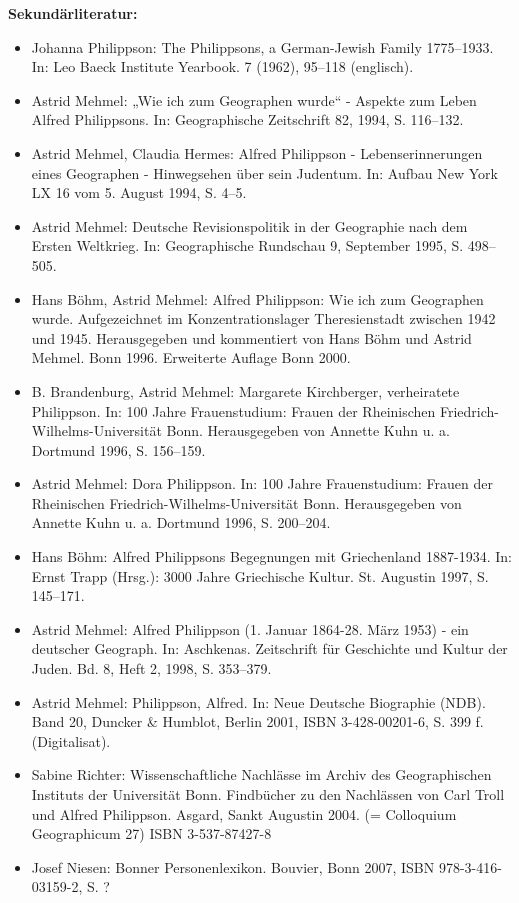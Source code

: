 \documentclass[a4paper]{article}
\begin{document}
\bigskip

\textbf{Sekundärliteratur:}

\begin{itemize}
\item Johanna Philippson: The Philippsons, a German-Jewish Family 1775–1933. In: Leo Baeck Institute Yearbook. 7 (1962),
95–118 (englisch).  
\item Astrid Mehmel: „Wie ich zum Geographen wurde“ - Aspekte zum Leben Alfred Philippsons. In: Geographische
Zeitschrift 82, 1994, S. 116–132.  
\item Astrid Mehmel, Claudia Hermes: Alfred Philippson - Lebenserinnerungen eines Geographen - Hinwegsehen über sein
Judentum. In: Aufbau New York LX 16 vom 5. August 1994, S. 4–5.  
\item Astrid Mehmel: Deutsche Revisionspolitik in der Geographie nach dem Ersten Weltkrieg. In: Geographische Rundschau
9, September 1995, S. 498–505.  
\item Hans Böhm, Astrid Mehmel: Alfred Philippson: Wie ich zum Geographen wurde. Aufgezeichnet im Konzentrationslager
Theresienstadt zwischen 1942 und 1945. Herausgegeben und kommentiert von Hans Böhm und Astrid Mehmel. Bonn 1996.
Erweiterte Auflage Bonn 2000.  
\item B. Brandenburg, Astrid Mehmel: Margarete Kirchberger, verheiratete Philippson. In: 100 Jahre Frauenstudium: Frauen
der Rheinischen Friedrich-Wilhelms-Universität Bonn. Herausgegeben von Annette Kuhn u. a. Dortmund 1996, S. 156–159. 
\item Astrid Mehmel: Dora Philippson. In: 100 Jahre Frauenstudium: Frauen der Rheinischen Friedrich-Wilhelms-Universität
Bonn. Herausgegeben von Annette Kuhn u. a. Dortmund 1996, S. 200–204.  
\item Hans Böhm: Alfred Philippsons Begegnungen mit Griechenland 1887-1934. In: Ernst Trapp (Hrsg.): 3000 Jahre
Griechische Kultur. St. Augustin 1997, S. 145–171.  
\item Astrid Mehmel: Alfred Philippson (1. Januar 1864-28. März 1953) - ein deutscher Geograph. In: Aschkenas.
Zeitschrift für Geschichte und Kultur der Juden. Bd. 8, Heft 2, 1998, S. 353–379.  
\item Astrid Mehmel: Philippson, Alfred. In: Neue Deutsche Biographie (NDB). Band 20, Duncker \& Humblot, Berlin 2001,
ISBN 3-428-00201-6, S. 399 f. (Digitalisat).  
\item Sabine Richter: Wissenschaftliche Nachlässe im Archiv des Geographischen Instituts der Universität Bonn.
Findbücher zu den Nachlässen von Carl Troll und Alfred Philippson. Asgard, Sankt Augustin 2004. (= Colloquium
Geographicum 27) ISBN 3-537-87427-8  
\item Josef Niesen: Bonner Personenlexikon. Bouvier, Bonn 2007, ISBN 978-3-416-03159-2, S. ?
\end{itemize}
\end{document}
